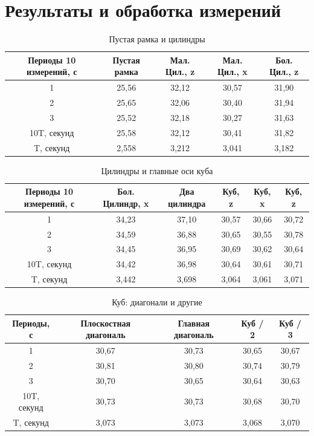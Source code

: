\section{Результаты и обработка измерений}
\begin{table}[!h]
   \centering\caption{Пустая рамка и цилиндры}
   \begin{tabular}{|c|c|c|c|c|}
   \hline
       Периоды 10 измерений, с& Пустая рамка & Мал. Цил.,  z & Мал. Цил.,  x & Бол. Цил., z \\ \hline
       1 & 25,56 & 32,12 & 30,57 & 31,90 \\ \hline
       2 & 25,65&32,06 & 30,40 & 31,94 \\ \hline
       3 & 25,52&32,18 & 30,27 & 31,63 \\ \hline
       10T, секунд & 25,58& 32,12 & 30,41 & 31,82 \\ \hline
       T, секунд & 2,558 &3,212 & 3,041 & 3,182 \\ \hline
   \end{tabular}
\end{table}
\begin{table}[!h]
   \centering\caption{Цилиндры и главные оси куба}
   \begin{tabular}{|c|c|c|c|c|c|}
   \hline
       Периоды 10 измерений, с & Бол. Цилиндр, x & Два цилиндра & Куб, z  & Куб, x  & Куб, z  \\ \hline
       1 & 34,23 & 37,10 & 30,57  & 30,66  & 30,72  \\ \hline
       2 & 34,59 & 36,88 & 30,65  & 30,55  & 30,78  \\ \hline
       3 & 34,45 & 36,95 & 30,69  & 30,62  & 30,64  \\ \hline
       10T, секунд & 34,42 & 36,98 & 30,64  & 30,61  & 30,71  \\ \hline
       T, секунд & 3,442 & 3,698 & 3,064 & 3,061  & 3,071  \\ \hline
   \end{tabular}
\end{table}
\begin{table}[!h]
   \centering
   \caption{Куб: диагонали и другие}
   \begin{tabular}{|c|c|c|c|c|}
   \hline
       Периоды, с & Плоскостная диагональ  & Главная диагональ & Куб / 2 & Куб / 3  \\ \hline
       1 & 30,67 & 30,73 & 30,65 & 30,67  \\ \hline
       2 & 30,81 & 30,80 & 30,74 & 30,79  \\ \hline
       3 & 30,70 & 30,65 & 30,64 & 30,63  \\ \hline
       10T, секунд & 30,73 & 30,73 & 30,68 & 30,70  \\ \hline
       T, секунд & 3,073 & 3,073 & 3,068 & 3,070  \\ \hline
   \end{tabular}
\end{table}
